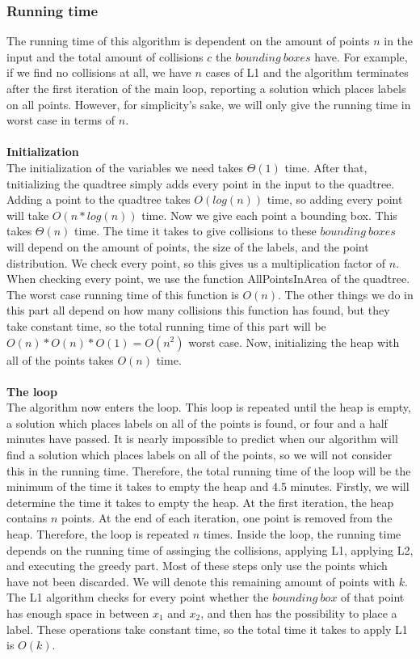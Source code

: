 \documentclass[crop=false,a4paper,oneside,11pt]{article}
\begin{document}
\subsubsection{Running time}
The running time of this algorithm is dependent on the amount of points $n$ in the input and the total amount of collisions $c$ the $bounding \ boxes$ have. For example, if we find no collisions at all, we have $n$ cases of L1 and the algorithm terminates after the first iteration of the main loop, reporting a solution which places labels on all points. However, for simplicity's sake, we will only give the running time in worst case in terms of $n$. \\ \\
\textbf{Initialization}\\
The initialization of the variables we need takes $\Theta(1)$ time. After that, tnitializing the quadtree simply adds every point in the input to the quadtree. Adding a point to the quadtree takes $O(log(n))$ time, so adding every point will take $O(n*log(n))$ time. Now we give each point a bounding box. This takes $\Theta(n)$ time. The time it takes to give collisions to these $bounding \ boxes$ will depend on the amount of points, the size of the labels, and the point distribution. We check  every point, so this gives us a multiplication factor of $n$. When checking every point, we use the function AllPointsInArea of the quadtree. The worst case running time of this function is $O(n)$. The other things we do in this part all depend on how many collisions this function has found, but they take constant time, so the total running time of this part will be $O(n)*O(n)*O(1) = O(n^2)$ worst case. Now, initializing the heap with all of the points takes $O(n)$ time.  \\ \\
 \textbf{The loop} \\
The algorithm now enters the loop. This loop is repeated until the heap is empty, a solution which places labels on all of the points is found, or four and a half minutes have passed. It is nearly impossible to predict when our algorithm will find a solution which places labels on all of the points, so we will not consider this in the running time. Therefore, the total running time of the loop will be the minimum of the time it takes to empty the heap and 4.5 minutes. Firstly, we will determine the time it takes to empty the heap. At the first iteration, the heap contains $n$ points. At the end of each iteration, one point is removed from the heap. Therefore, the loop is repeated $n$ times. Inside the loop, the running time depends on the running time of assinging the collisions, applying L1, applying L2, and executing the greedy part. Most of these steps only use the points which have not been discarded. We will denote this remaining amount of points with $k$. \\ The L1 algorithm checks for every point whether the $bounding \ box$ of that point has enough space in between $x_1$ and $x_2$, and then has the possibility to place a label. These operations take constant time, so the total time it takes to apply L1 is $O(k)$. \\
\end{document}
